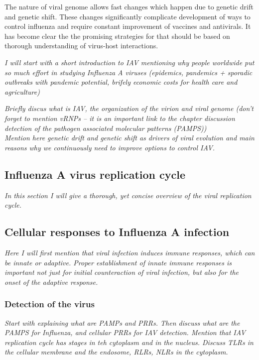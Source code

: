	The nature of viral genome allows fast changes which happen due to genetic drift and genetic shift. These changes significantly complicate development of ways to control influenza and require constant improvement of vaccines and antivirals. It has become clear the the promising strategies for that should be based on thorough understanding of virus-host interactions.
	
	
	\textit{I will start with a short introduction to IAV mentioning why people worldwide put so much effort in studying Influenza A viruses (epidemics, pandemics + sporadic outbreaks with pandemic potential, brifely economic costs for health care and agriculture)}
	
	\textit{Briefly discus what is IAV, the organization of the virion and viral genome (don't forget to mention vRNPs -- it is an important link to the chapter discussion detection of the pathogen associated molecular patterns (PAMPS))} \\
	
	 \textit{Mention here genetic drift and genetic shift as drivers of viral evolution and main reasons why we continuously need to improve options to control IAV.} \\

	\subsection{Influenza A virus replication cycle}
	
	\textit{In this section I will give a thorough, yet concise overview of the viral replication cycle.}

	\subsection{Cellular responses to Influenza A infection}
	
	\textit{Here I will first mention that viral infection induces immune responses, which can be innate or adaptive. Proper establishment of innate immune responses is important not just for initial counteraction of viral infection, but also for the onset of the adaptive response.}
		
		\subsubsection{Detection of the virus}
		
		\textit{Start with explaining what are PAMPs and PRRs. Then discuss what are the PAMPS for Influenza, and cellular PRRs for IAV detection. Mention that IAV replication cycle has stages in teh cytoplasm and in the nucleus. Discuss TLRs in the cellular membrane and the endosome, RLRs, NLRs in the cytoplasm.}
		

